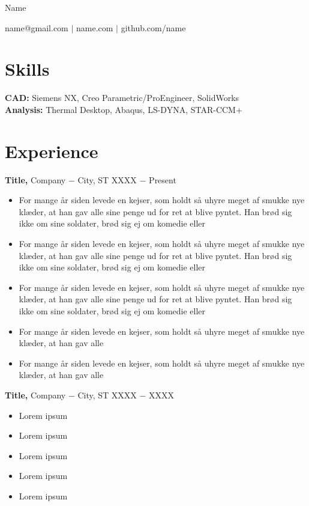 \documentclass[11pt,letterpaper]{article}
\begin{document}
\centerline{\Huge Name}
\centerline{name@gmail.com $|$ name.com $|$ github.com/name}

\section{Skills}
\textbf{CAD:} Siemens NX, Creo Parametric/ProEngineer, SolidWorks \\
\textbf{Analysis:} Thermal Desktop, Abaqus, LS-DYNA, STAR-CCM+

\section{Experience}
\textbf{Title,} Company $-$ City, ST \hfill XXXX $-$ Present \\
\begin{itemize}[itemsep=-2pt,leftmargin=12pt \vspace{-10pt}]
  \item For mange år siden levede en kejser, som holdt så uhyre meget af smukke nye klæder, at han gav alle sine penge ud for ret at blive pyntet. Han brød sig ikke om sine soldater, brød sig ej om komedie eller
  \item For mange år siden levede en kejser, som holdt så uhyre meget af smukke nye klæder, at han gav alle sine penge ud for ret at blive pyntet. Han brød sig ikke om sine soldater, brød sig ej om komedie eller
  \item For mange år siden levede en kejser, som holdt så uhyre meget af smukke nye klæder, at han gav alle sine penge ud for ret at blive pyntet. Han brød sig ikke om sine soldater, brød sig ej om komedie eller             
  \item For mange år siden levede en kejser, som holdt så uhyre meget af smukke nye klæder, at han gav alle
  \item For mange år siden levede en kejser, som holdt så uhyre meget af smukke nye klæder, at han gav alle
\end{itemize}

\textbf{Title,} Company $-$ City, ST \hfill XXXX $-$ XXXX \\
\begin{itemize}[itemsep=-2pt,leftmargin=12pt \vspace{-10pt}]
  \item Lorem ipsum
  \item Lorem ipsum
  \item Lorem ipsum
  \item Lorem ipsum
  \item Lorem ipsum
\end{itemize}
\end{document}
